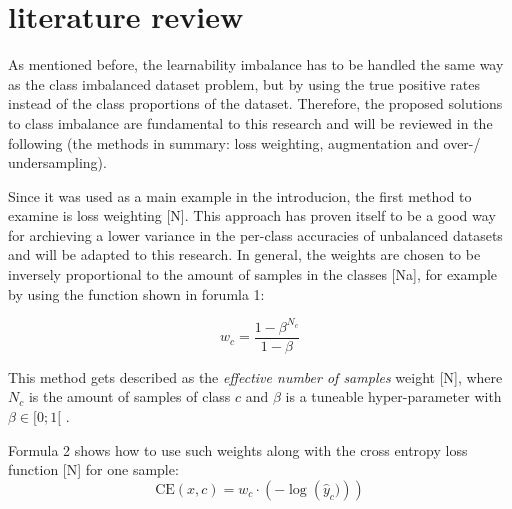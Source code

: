 \documentclass[journal]{IEEEtran}
\begin{document}
\section{literature review}
As mentioned before, the learnability imbalance has to be handled the same way as the class imbalanced dataset problem, but by using the true positive rates instead of the class proportions of the dataset.
Therefore, the proposed solutions to class imbalance are fundamental to this research and will be reviewed in the following (the methods in summary: loss weighting, augmentation and over-/ undersampling).

Since it was used as a main example in the introducion, the first method to examine is loss weighting [N]. 
This approach has proven itself to be a good way for archieving a lower variance in the per-class accuracies of unbalanced datasets and will be adapted to this research. 
In general, the weights are chosen to be inversely proportional to the amount of samples in the classes [Na], for example by using the function shown in forumla 1:

\[ w_c = \frac{1-\beta^{N_c}}{1-\beta} \]

This method gets described as the \emph{effective number of samples} weight [N], where $N_c$ is the amount of samples of class $c$ and $\beta$ is a tuneable hyper-parameter with $\beta \in [0;1[$ .

Formula 2 shows how to use such weights along with the cross entropy loss function [N] for one sample:
\[ \text{CE}(x, c) = w_{c} \cdot \left(-\log\left(\hat{y}_c)\right) \right) \]


\end{document}
